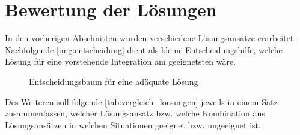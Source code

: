 \section{Bewertung der Lösungen}
In den vorherigen Abschnitten wurden verschiedene Lösungsansätze erarbeitet. Nachfolgende \autoref{img:entscheidung} dient als kleine Entscheidungshilfe, welche Lösung für eine vorstehende Integration am geeignetsten wäre. \\
\begin{figure}[H]
	\begin{center}
		{\footnotesize}
		\caption{Entscheidungsbaum für eine adäquate Lösung}
		\label{img:entscheidung}
	\end{center}
\end{figure}

Des Weiteren soll folgende \autoref{tab:vergleich_loesungen}  jeweils in einem Satz zusammenfassen, welcher Lösungsansatz bzw. welche Kombination aus Lösungsansätzen in welchen Situationen geeignet bzw. ungeeignet ist.

